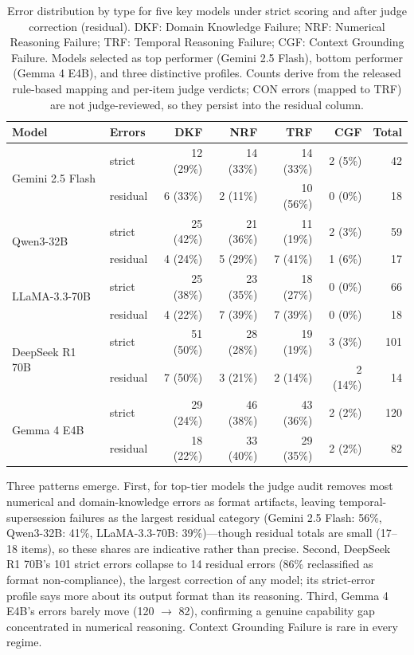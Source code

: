 \documentclass[11pt]{article}
\begin{document}
\begin{table}[t]
\centering\small
\begin{tabular}{llrrrrr}
\toprule
\textbf{Model} & \textbf{Errors} & \textbf{DKF} & \textbf{NRF} & \textbf{TRF} & \textbf{CGF} & \textbf{Total} \\
\midrule
\multirow{2}{*}{Gemini 2.5 Flash} & strict & 12 (29\%) & 14 (33\%) & 14 (33\%) & 2 (5\%) & 42 \\
 & residual & 6 (33\%) & 2 (11\%) & 10 (56\%) & 0 (0\%) & 18 \\
\multirow{2}{*}{Qwen3-32B} & strict & 25 (42\%) & 21 (36\%) & 11 (19\%) & 2 (3\%) & 59 \\
 & residual & 4 (24\%) & 5 (29\%) & 7 (41\%) & 1 (6\%) & 17 \\
\multirow{2}{*}{LLaMA-3.3-70B} & strict & 25 (38\%) & 23 (35\%) & 18 (27\%) & 0 (0\%) & 66 \\
 & residual & 4 (22\%) & 7 (39\%) & 7 (39\%) & 0 (0\%) & 18 \\
\multirow{2}{*}{DeepSeek R1 70B} & strict & 51 (50\%) & 28 (28\%) & 19 (19\%) & 3 (3\%) & 101 \\
 & residual & 7 (50\%) & 3 (21\%) & 2 (14\%) & 2 (14\%) & 14 \\
\multirow{2}{*}{Gemma 4 E4B} & strict & 29 (24\%) & 46 (38\%) & 43 (36\%) & 2 (2\%) & 120 \\
 & residual & 18 (22\%) & 33 (40\%) & 29 (35\%) & 2 (2\%) & 82 \\
\bottomrule
\end{tabular}
\caption{Error distribution by type for five key models under strict scoring and after judge correction (residual). DKF: Domain Knowledge Failure; NRF: Numerical Reasoning Failure; TRF: Temporal Reasoning Failure; CGF: Context Grounding Failure. Models selected as top performer (Gemini 2.5 Flash), bottom performer (Gemma 4 E4B), and three distinctive profiles. Counts derive from the released rule-based mapping and per-item judge verdicts; CON errors (mapped to TRF) are not judge-reviewed, so they persist into the residual column.}
\label{tab:errortax}
\end{table}

Three patterns emerge. First, for top-tier models the judge audit removes most numerical and domain-knowledge errors as format artifacts, leaving temporal-supersession failures as the largest residual category (Gemini 2.5 Flash: 56\%, Qwen3-32B: 41\%, LLaMA-3.3-70B: 39\%)---though residual totals are small (17--18 items), so these shares are indicative rather than precise. Second, DeepSeek R1 70B's 101 strict errors collapse to 14 residual errors (86\% reclassified as format non-compliance), the largest correction of any model; its strict-error profile says more about its output format than its reasoning. Third, Gemma 4 E4B's errors barely move (120 $\rightarrow$ 82), confirming a genuine capability gap concentrated in numerical reasoning. Context Grounding Failure is rare in every regime.
\end{document}
